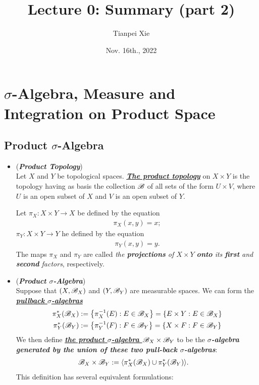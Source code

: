 \documentclass[11pt]{article}
\begin{document}
\title{Lecture 0:  Summary (part 2)}
\author{ Tianpei Xie}
\date{ Nov. 16th., 2022 }
\maketitle
\tableofcontents
\newpage
\section{$\sigma$-Algebra, Measure and Integration on Product Space}
\subsection{Product $\sigma$-Algebra}
\begin{itemize}
\item \begin{definition} (\emph{\textbf{Product Topology}})\\
Let $X$ and $Y$ be topological spaces. \underline{\emph{\textbf{The product topology}}} on $X \times Y$ is the topology having as basis the collection ${\mathscr B}$ of all sets of the form $U \times V$, where $U$ is an open subset of $X$ and $V$ is an open subset of $Y$.
\end{definition}

\begin{definition}
Let $\pi_X : X \times Y \rightarrow X$ be defined by the equation
\begin{align*}
\pi_X (x, y) = x;
\end{align*}
$\pi_Y : X \times Y \rightarrow Y$ he defined by the equation
\begin{align*}
\pi_Y (x, y) = y.
\end{align*}
The maps $\pi_X$ and $\pi_Y$ are called \emph{the \textbf{projections} of $X \times Y$ \textbf{onto} its \textbf{first} and \textbf{second} factors}, respectively.
\end{definition} 

\item \begin{definition} (\emph{\textbf{Product $\sigma$-Algebra}})\\
Suppose that $(X, {\mathscr B}_X)$ and $(Y, {\mathscr B}_Y)$ are measurable spaces. We can form the \underline{\emph{\textbf{pullback $\sigma$-algebras}}}
\begin{align*}
\pi_{X}^{*}({\mathscr B}_X) & := \left\{\pi_{X}^{-1}(E): E \in {\mathscr B}_X\right\} = \left\{E \times Y: E \in {\mathscr B}_X\right\}\\
\pi_{Y}^{*}({\mathscr B}_Y) & := \left\{\pi_{Y}^{-1}(F): F \in {\mathscr B}_Y\right\} = \left\{X \times F: F \in {\mathscr B}_Y\right\}
\end{align*}
We then define \underline{\emph{\textbf{the product $\sigma$-algebra ${\mathscr B}_X \times {\mathscr B}_Y$}}} to be the \emph{\textbf{$\sigma$-algebra} \textbf{generated by the union of these two pull-back $\sigma$-algebras}}:
\begin{align*}
{\mathscr B}_X \times {\mathscr B}_Y &:= \langle  \pi_{X}^{*}({\mathscr B}_X)  \cup  \pi_{Y}^{*}({\mathscr B}_Y)   \rangle.
\end{align*}
This definition has several equivalent formulations:
\end{definition}


\end{itemize}
\end{document}
